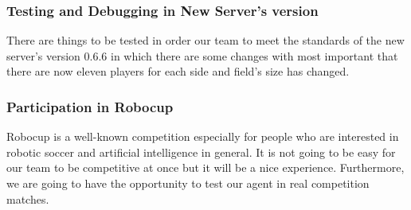 \subsubsection*{Testing and Debugging in New Server's version}
There are things to be tested in order our team to meet the standards of the new server's version 0.6.6 in which there are some changes with most important that there are now eleven players for each side and field's size has changed.


\subsubsection*{Participation in Robocup}
Robocup is a well-known competition especially for people who are interested in robotic soccer and artificial intelligence in general. It is not going to be easy for our team to be competitive at once but it will be a nice experience. Furthermore, we are going to have the opportunity to test our agent in real competition matches.